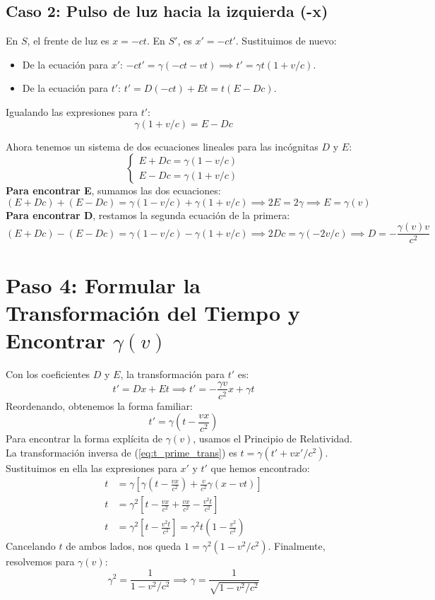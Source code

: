 \documentclass[11pt,a4paper]{book}
\begin{document}
\subsection*{Caso 2: Pulso de luz hacia la izquierda (-x)}
En $S$, el frente de luz es $x = -ct$. En $S'$, es $x' = -ct'$. Sustituimos de nuevo:
\begin{itemize}
    \item De la ecuación para $x'$: $-ct' = \gamma(-ct - vt) \implies t' = \gamma t (1 + v/c)$.
    \item De la ecuación para $t'$: $t' = D(-ct) + Et = t(E - Dc)$.
\end{itemize}
Igualando las expresiones para $t'$:
\begin{equation} \label{eq:sys2}
    \gamma (1 + v/c) = E - Dc
\end{equation}

Ahora tenemos un sistema de dos ecuaciones lineales para las incógnitas $D$ y $E$:
\[ \begin{cases} E + Dc = \gamma (1 - v/c) \\ E - Dc = \gamma (1 + v/c) \end{cases} \]
\textbf{Para encontrar E}, sumamos las dos ecuaciones:
\[ (E + Dc) + (E - Dc) = \gamma (1 - v/c) + \gamma (1 + v/c) \implies 2E = 2\gamma \implies \boxed{E = \gamma(v)} \]
\textbf{Para encontrar D}, restamos la segunda ecuación de la primera:
\[ (E + Dc) - (E - Dc) = \gamma (1 - v/c) - \gamma (1 + v/c) \implies 2Dc = \gamma(-2v/c) \implies \boxed{D = -\frac{\gamma(v) v}{c^2}} \]

\section*{Paso 4: Formular la Transformación del Tiempo y Encontrar \texorpdfstring{$\gamma(v)$}{gamma(v)}}
Con los coeficientes $D$ y $E$, la transformación para $t'$ es:
\[ t' = Dx + Et \implies t' = -\frac{\gamma v}{c^2}x + \gamma t \]
Reordenando, obtenemos la forma familiar:
\begin{equation} \label{eq:t_prime_trans}
    \boxed{t' = \gamma \left(t - \frac{vx}{c^2}\right)}
\end{equation}
Para encontrar la forma explícita de $\gamma(v)$, usamos el Principio de Relatividad. La transformación inversa de (\ref{eq:t_prime_trans}) es $t = \gamma(t' + vx'/c^2)$. Sustituimos en ella las expresiones para $x'$ y $t'$ que hemos encontrado:
\begin{align*}
    t &= \gamma \left[ \gamma \left(t - \frac{vx}{c^2}\right) + \frac{v}{c^2} \gamma(x - vt) \right] \\
    t &= \gamma^2 \left[ t - \frac{vx}{c^2} + \frac{vx}{c^2} - \frac{v^2t}{c^2} \right] \\
    t &= \gamma^2 \left[ t - \frac{v^2t}{c^2} \right] = \gamma^2 t \left(1 - \frac{v^2}{c^2}\right)
\end{align*}
Cancelando $t$ de ambos lados, nos queda $1 = \gamma^2 (1 - v^2/c^2)$. Finalmente, resolvemos para $\gamma(v)$:
\[ \gamma^2 = \frac{1}{1 - v^2/c^2} \implies \boxed{\gamma = \frac{1}{\sqrt{1 - v^2/c^2}}} \]
\end{document}
